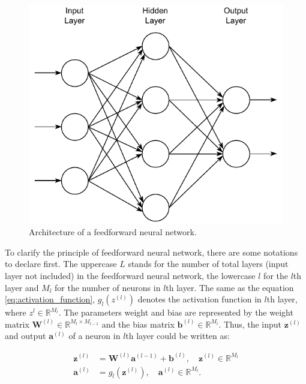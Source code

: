 \documentclass[
	parskip, 			   %
	twoside, 			   %
	DIV=14, 			   %
	BCOR=15.0mm, 		   %
	headsepline, 		   %
	open=right, 		   %
	captions=tableheading, %
	bibliography=totoc,    %
	numbers=noenddot       %
]{scrreprt}
\begin{document}
\begin{figure}[h!]
    \centering
    \includegraphics[scale=1]{figures/feedforward_neural_network.pdf}
    \caption{Architecture of a feedforward neural network.}
    \label{fig:feedforward}
\end{figure}

To clarify the principle of feedforward neural network, there are some notations to declare first. The uppercase $L$ stands for the number of total layers (input layer not included) in the feedforward neural network, the lowercase $l$ for the $l$th layer and $M_{l}$ for the number of neurons in $l$th layer. The same as the equation \ref{eq:activation_function}, $g_{l}(z^{(l)})$ denotes the activation function in $l$th layer, where $z^{l} \in \mathbb{R}^{M_{l}}$. The parameters weight and bias are represented by the weight matrix $\mathbf{W}^{(l)} \in \mathbb{R}^{M_{l} \times M_{l-1}}$ and the bias matrix $\mathbf{b}^{(l)} \in \mathbb{R}^{M_{l}}$. Thus, the input $\mathbf{z}^{(l)}$ and output $\mathbf{a}^{(l)}$ of a neuron in $l$th layer could be written as:

\begin{equation}
    \label{eq:input_output_neuron}
    \begin{aligned}
    \mathbf{z}^{(l)} &= \mathbf{W}^{(l)} \mathbf{a}^{(l-1)} + \mathbf{b}^{(l)}, \quad \mathbf{z}^{(l)} \in \mathbb{R}^{M_{l}}\\
    \mathbf{a}^{(l)} &= g_{l}(\mathbf{z}^{(l)}), \quad \mathbf{a}^{(l)} \in \mathbb{R}^{M_{l}}.
    \end{aligned}
\end{equation}
\end{document}
